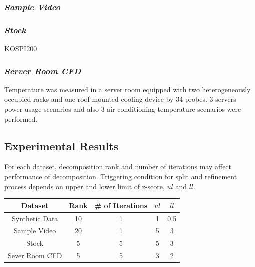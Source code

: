 \subsubsection{\em Sample Video}


\subsubsection{\em Stock}
KOSPI200

\subsubsection{\em Server Room CFD}
Temperature was measured in a server room equipped with two heterogeneously occupied racks and one roof-mounted cooling device by 34 probes. 3 servers power usage scenarios and also 3 air conditioning temperature scenarios were performed.

\newpage
\subsection{Experimental Results}
For each dataset, decomposition rank and number of iterations may affect performance of decomposition.
Triggering condition for split and refinement process depends on upper and lower limit of z-score, ${ul}$ and ${ll}$.

\begin{table}[htb]
	\small
	\centering
	\begin{tabular}{ c | cccc }
		\hline
		\textbf{Dataset} & \textbf{Rank} & \textbf{\# of Iterations} & \textbf{${ul}$} & \textbf{${ll}$} \\
		\hline
 		Synthetic Data & 10 & 1 & 1 & 0.5 \\
 		Sample Video & 20 & 1 & 5 & 3 \\
 		Stock & 5 & 5 & 5 & 3 \\
 		Sever Room CFD & 5 & 5 & 3 & 2 \\
		\hline
	\end{tabular}
\end{table}

